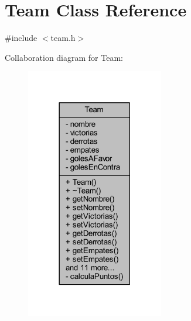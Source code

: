 \hypertarget{class_team}{}\section{Team Class Reference}
\label{class_team}


{\ttfamily \#include $<$team.\+h$>$}



Collaboration diagram for Team\+:\nopagebreak
\begin{figure}[H]
\begin{center}
\leavevmode
\includegraphics[width=170pt]{d1/d3f/class_team__coll__graph}
\end{center}
\end{figure}
